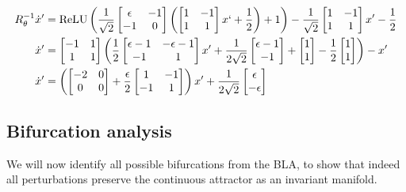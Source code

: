 \documentclass{article} %
\newcounter{ct}
\theoremstyle{definition}
\theoremstyle{remark}
\begin{document}
\begin{align}
R_{\theta}^{-1}\dot x' &= \operatorname{ReLU}\left(\frac{1}{\sqrt{2}}\begin{bmatrix}\epsilon &-1\\-1&0\end{bmatrix}\left(\begin{bmatrix}1 &-1\\1&1\end{bmatrix} x`+\frac{1}{2}\right)+1\right)-\frac{1}{\sqrt{2}}\begin{bmatrix}1 &-1\\1&1\end{bmatrix} x'-\frac{1}{2}\\
\dot x' &=\begin{bmatrix}-1 &1\\1&1\end{bmatrix}\left(\frac{1}{2}\begin{bmatrix}\epsilon - 1 &-\epsilon - 1\\-1&1\end{bmatrix}x' + \frac{1}{2\sqrt{2}}\begin{bmatrix}\epsilon - 1 \\-1\end{bmatrix}+\begin{bmatrix}1 \\1\end{bmatrix}-\frac{1}{2}\begin{bmatrix}1 \\1\end{bmatrix}\right)-x'\\
\dot x' &=\left(\begin{bmatrix}-2 &0\\0&0\end{bmatrix}+\frac{\epsilon}{2}\begin{bmatrix}1 &-1\\-1&1\end{bmatrix}\right)x' + \frac{1}{2\sqrt{2}}\begin{bmatrix}\epsilon \\-\epsilon\end{bmatrix}
\end{align}
\subsection{Bifurcation analysis}
We will now identify all possible bifurcations from the BLA, to show that indeed all perturbations preserve the continuous attractor as an invariant manifold.
\end{document}
